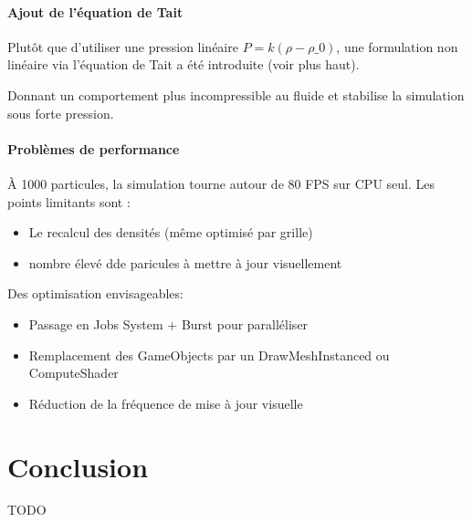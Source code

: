 \documentclass{article}
\begin{document}
\paragraph{Ajout de l'équation de Tait}

Plutôt que d’utiliser une pression linéaire \(P = k(ρ - ρ\_0)\), une formulation non linéaire via l’équation de Tait a été introduite (voir plus haut).

Donnant un comportement plus incompressible au fluide et stabilise la simulation sous forte pression.

\paragraph{Problèmes de performance}

À 1000 particules, la simulation tourne autour de 80 FPS sur CPU seul. Les points limitants sont :

\begin{itemize}
    \item Le recalcul des densités (même optimisé par grille)
    \item nombre élevé dde paricules à mettre à jour visuellement
\end{itemize}

Des optimisation envisageables:

\begin{itemize}
    \item Passage en Jobs System + Burst pour paralléliser
    \item Remplacement des GameObjects par un DrawMeshInstanced ou ComputeShader
    \item Réduction de la fréquence de mise à jour visuelle
\end{itemize}

\section{Conclusion}

TODO
\end{document}

